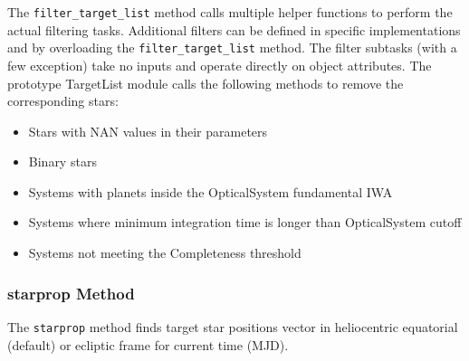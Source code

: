 \documentclass[cleanfoot]{asme2ej}
\begin{document}
The \verb+filter_target_list+ method calls multiple helper functions to perform the actual filtering tasks.  Additional filters can be defined in specific implementations and by overloading the  \verb+filter_target_list+ method.  The filter subtasks (with a few exception) take no inputs and operate directly on object attributes. The prototype TargetList module calls the following methods to remove the corresponding stars:
\begin{itemize}[leftmargin=2in,font={\ttfamily}]
    \item[\texttt nan\_filter] Stars with NAN values in their parameters
    \item[\texttt binary\_filter] Binary stars
    \item[\texttt outside\_IWA\_filter] Systems with planets inside the OpticalSystem fundamental IWA
    \item[\texttt int\_cutoff\_filter] Systems where minimum integration time is longer than OpticalSystem cutoff
    \item[\texttt completeness\_filter] Systems not meeting the Completeness threshold
\end{itemize}

\subsubsection{starprop Method} \label{sec:starproptask}
The \verb+starprop+ method finds target star positions vector in heliocentric equatorial (default) or ecliptic frame for current time (MJD).
\end{document}
